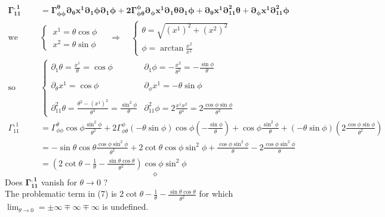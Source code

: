 \begin{align}
\boldsymbol{\Gamma_{11}^{,1}} &=\boldsymbol{\Gamma_{\phi\phi}^{\theta}\partial_{\theta}{x^{1}}\partial_{1}\phi\partial_{1}\phi+ 2\Gamma_{\phi\theta}^{\phi}\partial_{\phi}{x^{1}}\partial_{1}\theta\partial_{1}\phi+\partial_{\theta}{x^{1}}\partial^2_{11}{\theta}+\partial_{\phi}{x^{1}}\partial^2_{11}{\phi}}\\
\text{we have}\quad & \left \{ \begin{array}{l}
\ x^1 = \theta\cos\phi\\
\ x^2 = \theta\sin\phi\
\end{array}\right. \quad \Rightarrow \quad \left \{ \begin{array}{l}
\theta = \sqrt{(x^1)^2+(x^2)^2}\\
\phi = \arctan \frac{x^2}{x^1}
\end{array}\right.\\
\text{so}\ &\left \{ \begin{array}{ll}
\partial_{1} \theta = \frac{x^1}{\theta} = \cos\phi & \partial_{1} \phi = -\frac{x^2}{\theta^2} = -\frac{\sin\phi}{\theta}  \\\\
\partial_{\theta} x^1 = \cos\phi & \partial_{\phi} x^1 = -\theta\sin\phi\\\\
\partial^2_{11} \theta = \frac{\theta^2 -(x^1)^2}{\theta ^3} = \frac{\sin^2\phi}{\theta} & \partial^2_{11} \phi =2\frac{x^1 x^2}{\theta^4}= 2\frac{\cos\phi \sin\phi}{\theta^2}
\end{array}\right.\\
\Gamma_{11}^{,1} &=\Gamma_{\phi\phi}^{\theta}\cos\phi\frac{\sin^2\phi}{\theta^2}+ 2\Gamma_{\phi\theta}^{\phi}(-\theta\sin\phi)\cos\phi(-\frac{\sin\phi}{\theta} )+\cos\phi\frac{\sin^2\phi}{\theta}+(-\theta\sin\phi)(2\frac{\cos\phi \sin\phi}{\theta^2})\\
\ &= -\sin\theta\cos\theta\frac{\cos\phi \sin^2\phi}{\theta^2}+ 2\cot\theta\cos\phi\sin^2\phi+\frac{\cos\phi\sin^2\phi}{\theta}-2\frac{\cos\phi \sin^2\phi}{\theta}\\
\ &= (2\cot\theta -\frac{1}{\theta}-\frac{\sin\theta\cos\theta}{\theta^2})\cos\phi\sin^2\phi
\end{align}
$$\diamond$$
\newpage
Does $\boldsymbol{\Gamma_{11}^{,1}}$ vanish for $\theta \rightarrow0$ ? \\The problematic term in (7) is $2\cot\theta -\frac{1}{\theta}-\frac{\sin\theta\cos\theta}{\theta^2}$ for which $\lim_{\theta \to 0 }= \pm \infty \mp \infty \mp \infty$ is undefined. 
